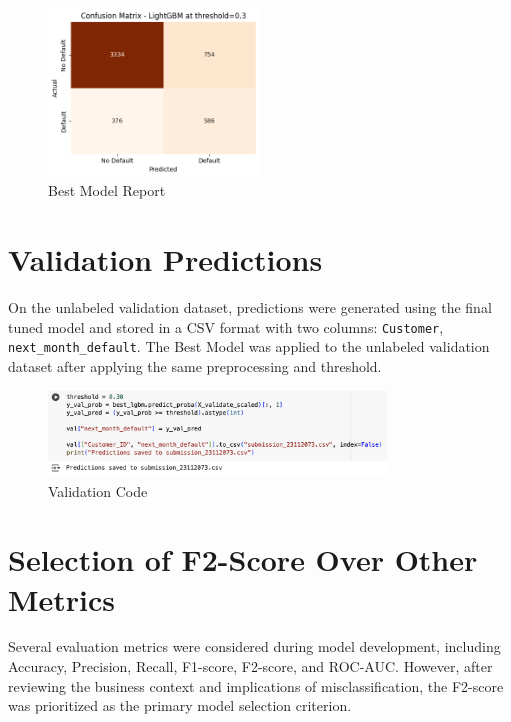 \documentclass[12pt,a4paper]{article}
\begin{document}
\begin{figure}[H]
    \centering
    \includegraphics[width=0.5\textwidth]{figures/20.png}
    \caption{Best Model Report}
\end{figure}







\section{Validation Predictions}

On the unlabeled validation dataset, predictions were generated using the final tuned model and stored in a CSV format with two columns: \texttt{Customer}, \texttt{next\_month\_default}. The Best Model was applied to the unlabeled validation dataset after applying the same preprocessing and threshold.

\begin{figure}[H]
    \centering
    \includegraphics[width=0.8\textwidth]{figures/21.png}
    \caption{Validation Code}
\end{figure}

\section{Selection of F2-Score Over Other Metrics}

Several evaluation metrics were considered during model development, including Accuracy, Precision, Recall, F1-score, F2-score, and ROC-AUC. However, after reviewing the business context and implications of misclassification, the F2-score was prioritized as the primary model selection criterion.
\end{document}
